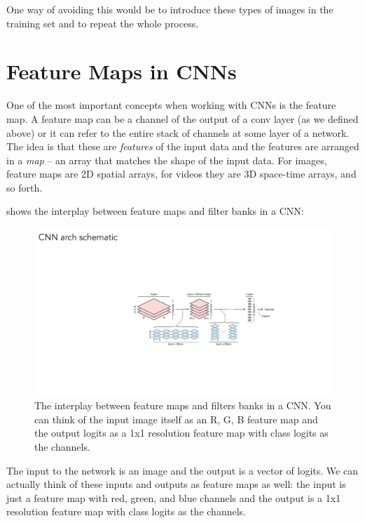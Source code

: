 One way of avoiding this would be to introduce these types of images in the training set and to repeat the whole process.


\section{Feature Maps in CNNs}

One of the most important concepts when working with CNNs is the feature map. A feature map can be a channel of the output of a conv layer (as we defined above) or it can refer to the entire stack of channels at some layer of a network. The idea is that these are \textit{features} of the input data and the features are arranged in a \textit{map} -- an array that matches the shape of the input data. For images, feature maps are 2D spatial arrays, for videos they are 3D space-time arrays, and so forth.

\Fig{\ref{fig:convolutional_neural_nets:feature_maps_schematic}} shows the interplay between feature maps and filter banks in a CNN:
\begin{figure}[h!]
    \centerline{
        \includegraphics[width=1.0\linewidth]{./figures/convolutional_neural_nets/feature_maps_schematic.pdf}}
    \caption{The interplay between feature maps and filters banks in a CNN. You can think of the input image itself as an R, G, B feature map and the output logits as a 1x1 resolution feature map with class logits as the channels.}
    \label{fig:convolutional_neural_nets:feature_maps_schematic}
\end{figure}

The input to the network is an image and the output is a vector of logits. We can actually think of these inputs and outputs as feature maps as well: the input is just a feature map with red, green, and blue channels and the output is a 1x1 resolution feature map with class logits as the channels.

